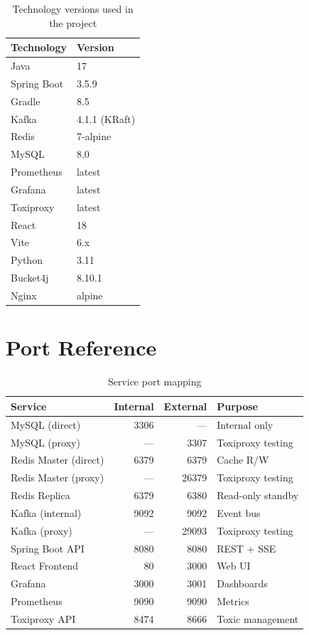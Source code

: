 \documentclass[12pt,a4paper,twoside]{article}
\begin{document}
\begin{table}[H]
\centering
\caption{Technology versions used in the project}
\begin{tabular}{@{}ll@{}}
\toprule
\textbf{Technology} & \textbf{Version} \\
\midrule
Java                & 17 \\
Spring Boot         & 3.5.9 \\
Gradle              & 8.5 \\
Kafka               & 4.1.1 (KRaft) \\
Redis               & 7-alpine \\
MySQL               & 8.0 \\
Prometheus          & latest \\
Grafana             & latest \\
Toxiproxy           & latest \\
React               & 18 \\
Vite                & 6.x \\
Python              & 3.11 \\
Bucket4j            & 8.10.1 \\
Nginx               & alpine \\
\bottomrule
\end{tabular}
\end{table}

\section{Port Reference}
\label{app:ports}

\begin{table}[H]
\centering
\caption{Service port mapping}
\begin{tabular}{@{}lrrp{5cm}@{}}
\toprule
\textbf{Service}     & \textbf{Internal} & \textbf{External} & \textbf{Purpose} \\
\midrule
MySQL (direct)       & 3306 & —    & Internal only \\
MySQL (proxy)        & —    & 3307 & Toxiproxy testing \\
Redis Master (direct)& 6379 & 6379 & Cache R/W \\
Redis Master (proxy) & —    & 26379& Toxiproxy testing \\
Redis Replica        & 6379 & 6380 & Read-only standby \\
Kafka (internal)     & 9092 & 9092 & Event bus \\
Kafka (proxy)        & —    & 29093& Toxiproxy testing \\
Spring Boot API      & 8080 & 8080 & REST + SSE \\
React Frontend       &   80 & 3000 & Web UI \\
Grafana              & 3000 & 3001 & Dashboards \\
Prometheus           & 9090 & 9090 & Metrics \\
Toxiproxy API        & 8474 & 8666 & Toxic management \\
\bottomrule
\end{tabular}
\end{table}
\end{document}
